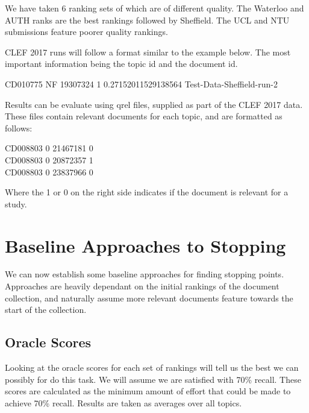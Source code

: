 We have taken 6 ranking sets of which are of different quality. The Waterloo and AUTH ranks are the best rankings followed by Sheffield. The UCL and NTU submissions feature poorer quality rankings.

CLEF 2017 runs will follow a format similar to the example below. The most important information being the topic id and the document id.


\begin{tcolorbox} \label{scoreExample}
CD010775 NF 19307324 1 0.27152011529138564 Test-Data-Sheffield-run-2 
\end{tcolorbox}

Results can be evaluate using qrel files, supplied as part of the CLEF 2017 data. These files contain relevant documents for each topic, and are formatted as follows:

\begin{tcolorbox}
CD008803     0  21467181     0  \\
CD008803     0  20872357     1  \\
CD008803     0  23837966     0 
\end{tcolorbox}

Where the 1 or 0 on the right side indicates if the document is relevant for a study.



\section{Baseline Approaches to Stopping} \label{baselineapp}

We can now establish some baseline approaches for finding stopping points. Approaches are heavily dependant on the initial rankings of the document collection, and naturally assume more relevant documents feature towards the start of the collection.

\subsection{Oracle Scores} \label{oracleScores}

Looking at the oracle scores for each set of rankings will tell us the best we can possibly for do this task.  We will assume we are satisfied with 70\% recall. These scores are calculated as the minimum amount of effort that could be made to achieve 70\% recall. Results are taken as averages over all topics.


